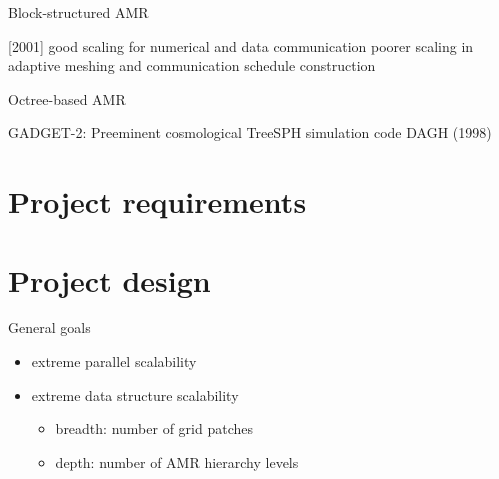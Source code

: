 \documentclass[14pt,letter]{article}
\begin{document}
  Block-structured AMR


   [2001]
   good scaling for numerical and data communication
   poorer scaling in adaptive meshing and communication schedule construction 


  Octree-based AMR

GADGET-2: Preeminent cosmological TreeSPH simulation code
DAGH (1998)

\section{Project requirements}

\section{Project design}

General goals

\begin{itemize}
\item extreme parallel scalability
\item extreme data structure scalability
  \begin{itemize}
  \item breadth: number of grid patches
  \item depth: number of AMR hierarchy levels
  \end{itemize}
\end{itemize}
\end{document}
